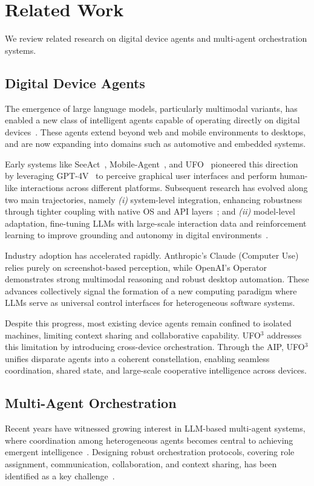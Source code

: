 \documentclass[10pt]{article} %
\newcommand{\ufo}{\textsc{UFO}$^3$\xspace}
\begin{document}
\section{Related Work}
We review related research on digital device agents and multi-agent orchestration systems.

\subsection{Digital Device Agents}
The emergence of large language models, particularly multimodal variants, has enabled a new class of intelligent agents capable of operating directly on digital devices~\cite{zhang2024large}. These agents extend beyond web and mobile environments to desktops, and are now expanding into domains such as automotive and embedded systems.

Early systems like SeeAct~\cite{zheng2024gpt}, Mobile-Agent~\cite{wang2024mobile}, and UFO~\cite{zhang2025ufo} pioneered this direction by leveraging GPT-4V~\cite{yang2023dawn} to perceive graphical user interfaces and perform human-like interactions across different platforms. Subsequent research has evolved along two main trajectories, namely \textit{(i)} system-level integration, enhancing robustness through tighter coupling with native OS and API layers~\cite{zhang2025api, zhang2025ufo2}; and \textit{(ii)} model-level adaptation, fine-tuning LLMs with large-scale interaction data and reinforcement learning to improve grounding and autonomy in digital environments~\cite{luo2025gui, zheng2025vem, wang2025ui}. 

Industry adoption has accelerated rapidly. Anthropic's Claude (Computer Use)~\cite{anthropic2024} relies purely on screenshot-based perception, while OpenAI's Operator~\cite{cua2025} demonstrates strong multimodal reasoning and robust desktop automation. These advances collectively signal the formation of a new computing paradigm where LLMs serve as universal control interfaces for heterogeneous software systems.

Despite this progress, most existing device agents remain confined to isolated machines, limiting context sharing and collaborative capability. \ufo addresses this limitation by introducing cross-device orchestration. Through the AIP, \ufo unifies disparate agents into a coherent constellation, enabling seamless coordination, shared state, and large-scale cooperative intelligence across devices.


\subsection{Multi-Agent Orchestration}
Recent years have witnessed growing interest in LLM-based multi-agent systems, where coordination among heterogeneous agents becomes central to achieving emergent intelligence~\cite{guo2024large}. Designing robust orchestration protocols, covering role assignment, communication, collaboration, and context sharing, has been identified as a key challenge~\cite{bhatt2025should, dang2025multi, kong2025survey}.
\end{document}
